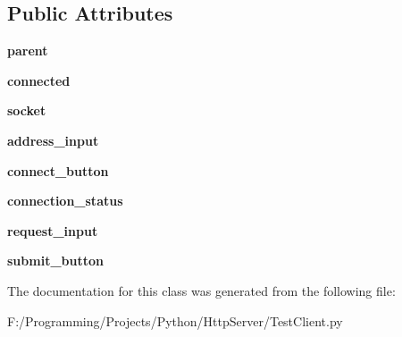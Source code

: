\subsection*{Public Attributes}
\begin{DoxyCompactItemize}
\item 
\hypertarget{class_test_client_1_1_application_a5fc025a442e966241b6b7f2cde359473}{{\bfseries parent}}\label{class_test_client_1_1_application_a5fc025a442e966241b6b7f2cde359473}

\item 
\hypertarget{class_test_client_1_1_application_a321bc430045c020ee83761ed22520ff6}{{\bfseries connected}}\label{class_test_client_1_1_application_a321bc430045c020ee83761ed22520ff6}

\item 
\hypertarget{class_test_client_1_1_application_aa25d1a3f581eb1b4b9bd94f59cc7ae95}{{\bfseries socket}}\label{class_test_client_1_1_application_aa25d1a3f581eb1b4b9bd94f59cc7ae95}

\item 
\hypertarget{class_test_client_1_1_application_ae534772040c83ea9f38b45379df419ce}{{\bfseries address\+\_\+input}}\label{class_test_client_1_1_application_ae534772040c83ea9f38b45379df419ce}

\item 
\hypertarget{class_test_client_1_1_application_afe39af6e264b4e3fc21deb46f6fb30b1}{{\bfseries connect\+\_\+button}}\label{class_test_client_1_1_application_afe39af6e264b4e3fc21deb46f6fb30b1}

\item 
\hypertarget{class_test_client_1_1_application_a13a27501b6470b846f115852866fce46}{{\bfseries connection\+\_\+status}}\label{class_test_client_1_1_application_a13a27501b6470b846f115852866fce46}

\item 
\hypertarget{class_test_client_1_1_application_aafbccfe7baa85d74e8087e455bb9712f}{{\bfseries request\+\_\+input}}\label{class_test_client_1_1_application_aafbccfe7baa85d74e8087e455bb9712f}

\item 
\hypertarget{class_test_client_1_1_application_a53e3924d3555d004d08235c230507472}{{\bfseries submit\+\_\+button}}\label{class_test_client_1_1_application_a53e3924d3555d004d08235c230507472}

\end{DoxyCompactItemize}


The documentation for this class was generated from the following file\+:\begin{DoxyCompactItemize}
\item 
F\+:/\+Programming/\+Projects/\+Python/\+Http\+Server/Test\+Client.\+py\end{DoxyCompactItemize}
